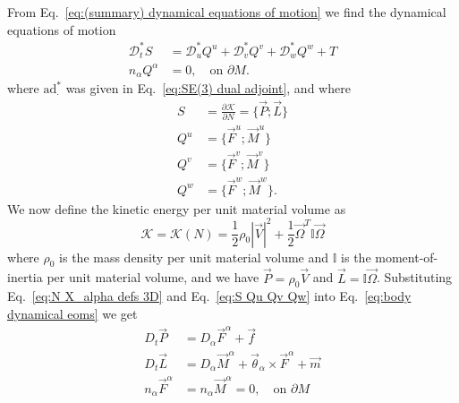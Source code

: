 From Eq.~\ref{eq:(summary) dynamical equations of motion} we find the dynamical equations of motion
\begin{subequations}  \label{eq:body dynamical eoms}
\begin{align}
\mathcal{D}^*_t S & = \mathcal{D}_u^* Q^u + \mathcal{D}_v^* Q^v + \mathcal{D}_w^* Q^w + T  \\
n_\alpha Q^\alpha & = 0, \quad \text{on } \partial M.
\end{align}
\end{subequations}
where $\text{ad}_{\cdot}^*$ was given in Eq.~\ref{eq:SE(3) dual adjoint}, and where
\begin{subequations} \label{eq:S Qu Qv Qw}
\begin{align}
S & = \frac{\partial \mathcal{K}}{\partial N} = \{ \vec{P} ; \vec{L} \} \\
Q^u & = \{ \vec{F}^u ; \vec{M}^u \} \\
Q^v & = \{ \vec{F}^v ; \vec{M}^v \} \\
Q^w & = \{ \vec{F}^w ; \vec{M}^w \}.
\end{align}
\end{subequations}
We now define the kinetic energy per unit material volume as
\begin{equation} \label{eq:KE of cosserat body}
\mathcal{K} = \mathcal{K}(N)  = \frac{1}{2} \rho_0 |\vec{V}|^2 +  \frac{1}{2} \vec{\Omega}^T \mathbb{I} \vec{\Omega}
\end{equation}
where $\rho_0$ is the mass density per unit material volume and $\mathbb{I}$ is the moment-of-inertia per unit material volume, and we have $\vec{P} = \rho_0 \vec{V}$ and $\vec{L} = \mathbb{I} \vec{\Omega}$. Substituting Eq.~\ref{eq:N X_alpha defs 3D} and Eq.~\ref{eq:S Qu Qv Qw} into Eq.~\ref{eq:body dynamical eoms} we get
\begin{subequations} \label{eq:cosserat body dynamic eoms}
\begin{align}
D_t \vec{P} & = D_\alpha \vec{F}^\alpha + \vec{f} \label{eq:body P eom} \\
D_t \vec{L} & = D_\alpha \vec{M}^\alpha + \vec{\theta}_\alpha \times \vec{F}^\alpha + \vec{m} \label{eq:body L eom} \\
n_\alpha \vec{F}^\alpha & = n_\alpha \vec{M}^\alpha = 0, \quad \text{on } \partial M 
\end{align}
\end{subequations}
